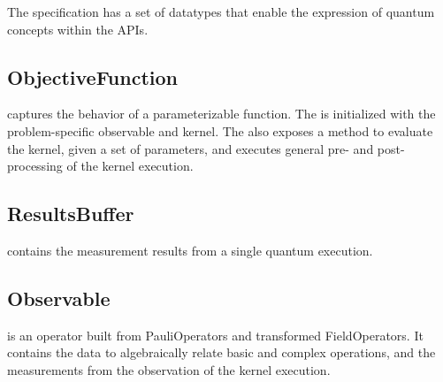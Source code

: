 The \qcor specification has a set of datatypes that enable the expression of quantum concepts within the \qcor \ac{API}s.\\

\subsection{\textbf{ObjectiveFunction}}\label{subsec:ObjectiveFunction}
 captures the behavior of a parameterizable function. The  is initialized with the problem-specific observable and kernel. The  also exposes a method to evaluate the kernel, given a set of parameters, and executes general pre- and post-processing of the kernel execution.\\

\subsection{\textbf{ResultsBuffer}}\label{subsec:ResultsBuffer}
 contains the measurement results from a single quantum execution.\\

\subsection{\textbf{Observable}}\label{subsec:Observable}
 is an operator built from PauliOperators and transformed FieldOperators.
It contains the data to algebraically relate basic and complex operations, 
and the measurements from the observation of the kernel execution.\\

